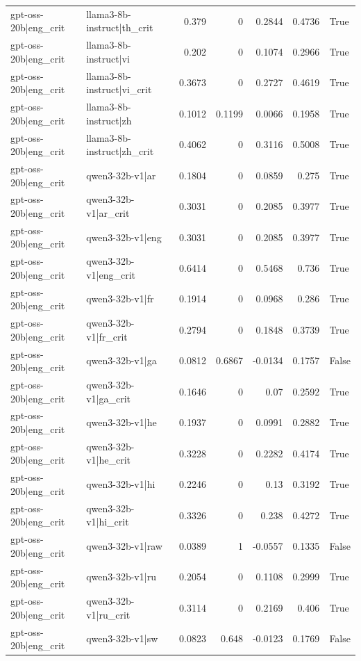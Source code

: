 \begin{table}
\begin{tabular}{l l r r r r l}
gpt-oss-20b|eng_crit & llama3-8b-instruct|th_crit & 0.379 & 0 & 0.2844 & 0.4736 & True \\
gpt-oss-20b|eng_crit & llama3-8b-instruct|vi & 0.202 & 0 & 0.1074 & 0.2966 & True \\
gpt-oss-20b|eng_crit & llama3-8b-instruct|vi_crit & 0.3673 & 0 & 0.2727 & 0.4619 & True \\
gpt-oss-20b|eng_crit & llama3-8b-instruct|zh & 0.1012 & 0.1199 & 0.0066 & 0.1958 & True \\
gpt-oss-20b|eng_crit & llama3-8b-instruct|zh_crit & 0.4062 & 0 & 0.3116 & 0.5008 & True \\
gpt-oss-20b|eng_crit & qwen3-32b-v1|ar & 0.1804 & 0 & 0.0859 & 0.275 & True \\
gpt-oss-20b|eng_crit & qwen3-32b-v1|ar_crit & 0.3031 & 0 & 0.2085 & 0.3977 & True \\
gpt-oss-20b|eng_crit & qwen3-32b-v1|eng & 0.3031 & 0 & 0.2085 & 0.3977 & True \\
gpt-oss-20b|eng_crit & qwen3-32b-v1|eng_crit & 0.6414 & 0 & 0.5468 & 0.736 & True \\
gpt-oss-20b|eng_crit & qwen3-32b-v1|fr & 0.1914 & 0 & 0.0968 & 0.286 & True \\
gpt-oss-20b|eng_crit & qwen3-32b-v1|fr_crit & 0.2794 & 0 & 0.1848 & 0.3739 & True \\
gpt-oss-20b|eng_crit & qwen3-32b-v1|ga & 0.0812 & 0.6867 & -0.0134 & 0.1757 & False \\
gpt-oss-20b|eng_crit & qwen3-32b-v1|ga_crit & 0.1646 & 0 & 0.07 & 0.2592 & True \\
gpt-oss-20b|eng_crit & qwen3-32b-v1|he & 0.1937 & 0 & 0.0991 & 0.2882 & True \\
gpt-oss-20b|eng_crit & qwen3-32b-v1|he_crit & 0.3228 & 0 & 0.2282 & 0.4174 & True \\
gpt-oss-20b|eng_crit & qwen3-32b-v1|hi & 0.2246 & 0 & 0.13 & 0.3192 & True \\
gpt-oss-20b|eng_crit & qwen3-32b-v1|hi_crit & 0.3326 & 0 & 0.238 & 0.4272 & True \\
gpt-oss-20b|eng_crit & qwen3-32b-v1|raw & 0.0389 & 1 & -0.0557 & 0.1335 & False \\
gpt-oss-20b|eng_crit & qwen3-32b-v1|ru & 0.2054 & 0 & 0.1108 & 0.2999 & True \\
gpt-oss-20b|eng_crit & qwen3-32b-v1|ru_crit & 0.3114 & 0 & 0.2169 & 0.406 & True \\
gpt-oss-20b|eng_crit & qwen3-32b-v1|sw & 0.0823 & 0.648 & -0.0123 & 0.1769 & False \\

\end{tabular}
\end{table}
